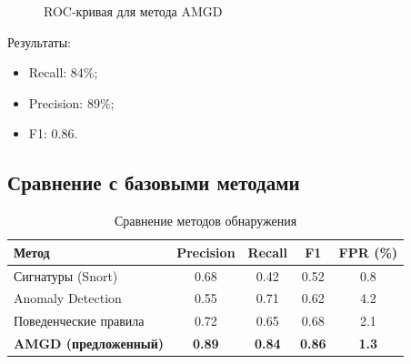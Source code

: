 \begin{figure}[ht]
\centering
{}
\caption{ROC-кривая для метода AMGD}
\label{fig:roc}
\end{figure}

Результаты:

\begin{itemize}
    \item Recall: 84\%;
    \item Precision: 89\%;
    \item F1: 0.86.
\end{itemize}
\subsection{Сравнение с базовыми методами}

\begin{table}[h]
    \centering
    \caption{Сравнение методов обнаружения}
    \label{tab:comparison1}
    \begin{tabular}{lcccc}
        \toprule
        Метод                        & Precision     & Recall        & F1            & FPR (\%)     \\
        \midrule
        Сигнатуры (Snort)            & 0.68          & 0.42          & 0.52          & 0.8          \\
        Anomaly Detection            & 0.55          & 0.71          & 0.62          & 4.2          \\
        Поведенческие правила        & 0.72          & 0.65          & 0.68          & 2.1          \\
        \textbf{AMGD (предложенный)} & \textbf{0.89} & \textbf{0.84} & \textbf{0.86} & \textbf{1.3} \\
        \bottomrule
    \end{tabular}
\end{table}

